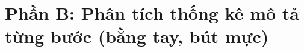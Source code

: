 \section{Phần B: Phân tích thống kê mô tả từng bước (bằng tay, bút mực)}

\newpage
\text{ }
\newpage
\text{ }